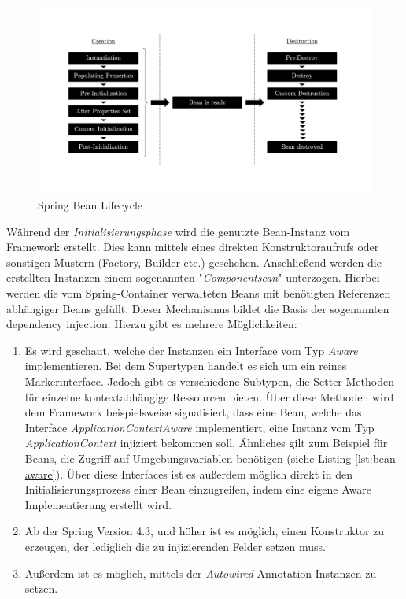 \begin{figure}[ht!]
	\centering
	\includegraphics[width=\linewidth]{kapitel/ergebnisanalyse/_img/bean-lifecycle}
	\caption[Bean Lifecycle]{Spring Bean Lifecycle \cite{bean-lifecycle}}
	\label{fig:bean-init}
\end{figure}

Während der \emph{Initialisierungsphase} wird die genutzte Bean-Instanz vom Framework erstellt. Dies kann mittels eines direkten Konstruktoraufrufs oder sonstigen Mustern (Factory, Builder etc.) geschehen. Anschließend werden die erstellten Instanzen einem sogenannten "\emph{Componentscan}" unterzogen. Hierbei werden die vom Spring-Container verwalteten Beans mit benötigten Referenzen abhängiger Beans gefüllt. Dieser Mechanismus bildet die Basis der sogenannten dependency injection. Hierzu gibt es mehrere Möglichkeiten:

\begin{enumerate}

	\item Es wird geschaut, welche der Instanzen ein Interface vom Typ \emph{Aware} implementieren. Bei dem Supertypen handelt es sich um ein reines Markerinterface. Jedoch gibt es verschiedene Subtypen, die Setter-Methoden für einzelne kontextabhängige Ressourcen bieten. Über diese Methoden wird dem Framework beispielsweise signalisiert, dass eine Bean, welche das Interface \emph{ApplicationContextAware} implementiert, eine Instanz vom Typ \emph{ApplicationContext} injiziert bekommen soll. Ähnliches gilt zum Beispiel für Beans, die Zugriff auf Umgebungsvariablen benötigen (siehe Listing \ref{lst:bean-aware}). Über diese Interfaces ist es außerdem möglich direkt in den Initialisierungsprozess einer Bean einzugreifen, indem eine eigene Aware Implementierung erstellt wird.

	\item Ab der Spring Version 4.3, und höher ist es möglich, einen Konstruktor zu erzeugen, der lediglich die zu injizierenden Felder setzen muss.

	\item Außerdem ist es möglich, mittels der \emph{Autowired}-Annotation Instanzen zu setzen.
	
\end{enumerate}

